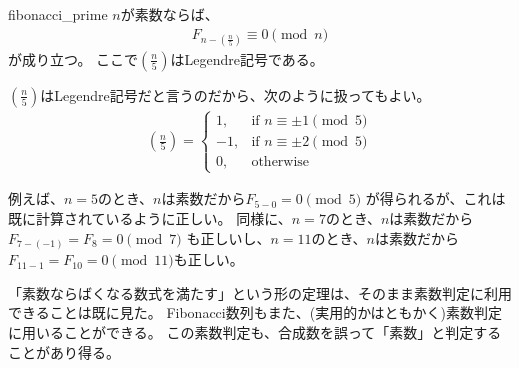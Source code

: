 \begin{Theo}{}{fibonacci_prime}
$n$が素数ならば、
\begin{align*}
F_{n - \left(\frac{n}{5}\right)} \equiv 0 \pmod{n}
\end{align*}
が成り立つ。
ここで$\left(\frac{n}{5}\right)$はLegendre記号である。
\end{Theo}

$\left(\frac{n}{5}\right)$はLegendre記号だと言うのだから、次のように扱ってもよい。
\begin{align*}
\left(\frac{n}{5}\right) =
\begin{cases}
1, &\mbox{if }n \equiv \pm 1 \pmod{5}\\
-1, &\mbox{if }n \equiv \pm 2 \pmod{5}\\
0, &\mbox{otherwise}
\end{cases}
\end{align*}

例えば、$n=5$のとき、$n$は素数だから$F_{5 - 0} = 0 \pmod{5}$
が得られるが、これは既に計算されているように正しい。
同様に、$n=7$のとき、$n$は素数だから
$F_{7 - (-1)} = F_{8} = 0 \pmod{7}$
も正しいし、$n=11$のとき、$n$は素数だから
$F_{11 - 1} = F_{10} = 0 \pmod{11}$も正しい。

「素数ならばくなる数式を満たす」という形の定理は、そのまま素数判定に利用できることは既に見た。
Fibonacci数列もまた、(実用的かはともかく)素数判定に用いることができる。
この素数判定も、合成数を誤って「素数」と判定することがあり得る。


